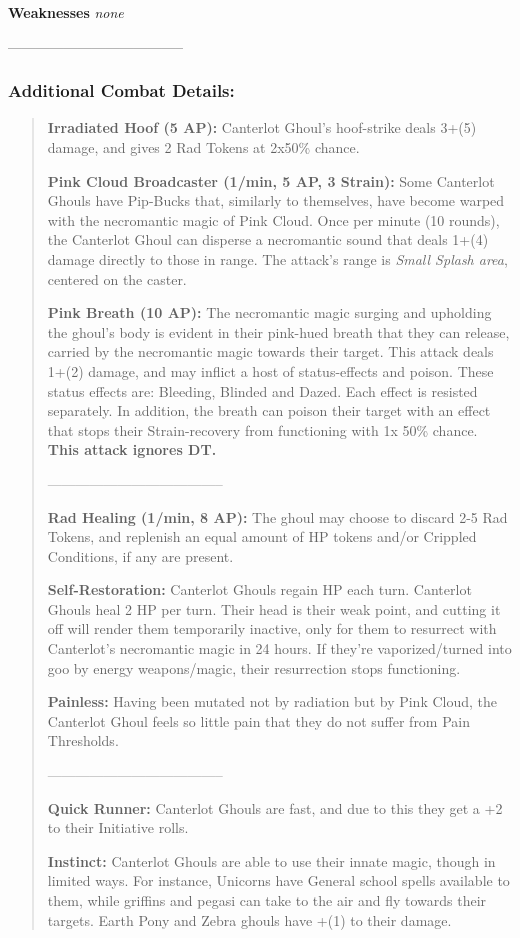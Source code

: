 \documentclass[11pt,a4paper,twocolumn]{book}
\begin{document}
	\noindent
	\textbf{Weaknesses} \emph{none} %
	
	--------------------------------------

\subsubsection*{Additional Combat Details:}
\begin{verse}
	\textbf{Irradiated Hoof (5 AP):} Canterlot Ghoul's hoof-strike deals 3+(5) damage, and gives 2 Rad Tokens at 2x50\% chance.
	
	\textbf{Pink Cloud Broadcaster (1/min, 5 AP, 3 Strain):} Some Canterlot Ghouls have Pip-Bucks that, similarly to themselves, have become warped with the necromantic magic of Pink Cloud. Once per minute (10 rounds), the Canterlot Ghoul can disperse a necromantic sound that deals 1+(4) damage directly to those in range. The attack's range is \textit{Small Splash area}, centered on the caster.
	
	\textbf{Pink Breath (10 AP):} The necromantic magic surging and upholding the ghoul's body is evident in their pink-hued breath that they can release, carried by the necromantic magic towards their target. This attack deals 1+(2) damage, and may inflict a host of status-effects and poison. These status effects are: Bleeding, Blinded and Dazed. Each effect is resisted separately. In addition, the breath can poison their target with an effect that stops their Strain-recovery from functioning with 1x 50\% chance. \textbf{This attack ignores DT.}
	
	--------------------------------------
	
	\textbf{Rad Healing (1/min, 8 AP):} The ghoul may choose to discard 2-5 Rad Tokens, and replenish an equal amount of HP tokens and/or Crippled Conditions, if any are present.
	
	\textbf{Self-Restoration:} Canterlot Ghouls regain HP each turn. Canterlot Ghouls heal 2 HP per turn. Their head is their weak point, and cutting it off will render them temporarily inactive, only for them to resurrect with Canterlot's necromantic magic in 24 hours. If they're vaporized/turned into goo by energy weapons/magic, their resurrection stops functioning.
	
	\textbf{Painless:} Having been mutated not by radiation but by Pink Cloud, the Canterlot Ghoul feels so little pain that they do not suffer from Pain Thresholds.
	
	--------------------------------------
	
	\textbf{Quick Runner:} Canterlot Ghouls are fast, and due to this they get a +2 to their Initiative rolls.	
	
	\textbf{Instinct:} Canterlot Ghouls are able to use their innate magic, though in limited ways. For instance, Unicorns have General school spells available to them, while griffins and pegasi can take to the air and fly towards their targets. Earth Pony and Zebra ghouls have +(1) to their damage. 
	
\end{verse}
\end{document}
